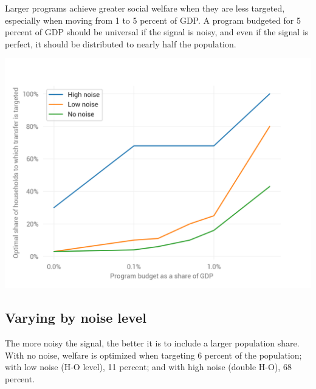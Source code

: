 \documentclass[12pt]{article}
\begin{document}
Larger programs achieve greater social welfare when they are less targeted, 
especially when moving from 1 to 5 percent of GDP. A program budgeted for 5 
percent of GDP should be universal if the signal is noisy, and even if the 
signal is perfect, it should be distributed to nearly half the population.

\begin{center}
	\includegraphics{optimal_targeting_by_size_noise}  %
	\label{fig:optimal_targeting_by_size_noise}
\end{center}

\subsection{Varying by noise level} \label{varying_by_noise}

The more noisy the signal, the better it is to include a larger population 
share. With no noise, welfare is optimized when targeting 6 percent of the 
population; with low noise (H-O level), 11 percent; and with high noise (double 
H-O), 68 percent.
\end{document}
